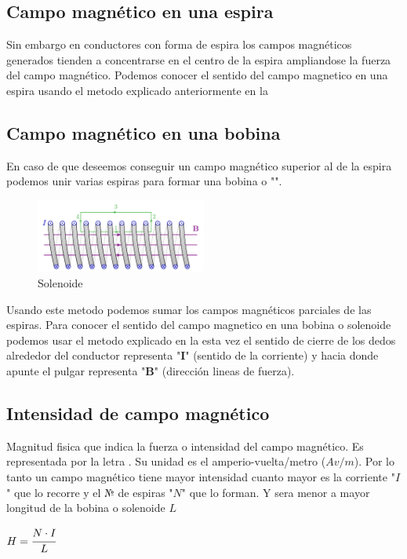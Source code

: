 \documentclass{report}
\begin{document}
  \subsection{Campo magnético en una espira}\label{ssec:espira}
Sin embargo en conductores con forma de espira los campos magnéticos generados tienden a concentrarse en el centro de la espira 
ampliandose la fuerza del campo magnético. Podemos conocer el sentido del campo magnetico en una espira usando el metodo
explicado anteriormente en la 


  \subsection{Campo magnético en una bobina }\label{ssec:bobina}
En caso de que deseemos conseguir un campo magnético superior al de la espira
podemos unir varias espiras para formar una bobina o "". {\hspace*{\fill}}
\begin{figure}
  \includegraphics[width=0.5\textwidth]{magnetic_field_solenoid.pdf} 
  \caption{Solenoide}
  \label{fig:solenoide}
\end{figure}
Usando este metodo podemos sumar los campos magnéticos parciales de las espiras. 
Para conocer el sentido del campo magnetico en una bobina o solenoide podemos usar el metodo explicado en la {}
esta vez el sentido de cierre de los dedos alrededor del conductor representa "\(\mathbf{I}\)" (sentido de la corriente) 
y hacia donde apunte el pulgar representa "\(\mathbf{B}\)" (dirección lineas de fuerza).\hfill
\newpage
\subsection{Intensidad de campo magnético}\label{ssec:intensidad_de_campo_magnético}
Magnitud fisica que indica la fuerza o intensidad del campo magnético. Es representada por la letra . Su unidad es el amperio-vuelta/metro (\(Av/m \)).\fspace{1em} 
Por lo tanto un campo magnético tiene mayor intensidad cuanto mayor es la corriente "\(I\)" que lo recorre y el № de espiras "\(N\)" que lo forman.
Y sera menor a mayor longitud de la bobina o solenoide \(L\)
\begin{center}
  \label{eq:intensidad_campo_magnetico}
  \begin{math}
    H = \cfrac{N\cdot I}{L}
  \end{math}
  
\end{center}
\end{document}
